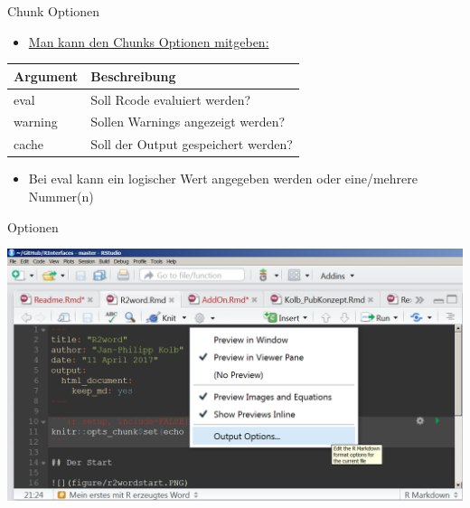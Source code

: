 \documentclass[ignorenonframetext,]{beamer}
\providecommand{\tightlist}{%
\setlength{\itemsep}{0pt}\setlength{\parskip}{0pt}}
\begin{document}
\begin{frame}{Chunk Optionen}

\begin{itemize}
\tightlist
\item
  \href{https://yihui.name/knitr/options/}{Man kann den Chunks Optionen
  mitgeben:}
\end{itemize}

\begin{longtable}[]{@{}ll@{}}
\toprule
Argument & Beschreibung\tabularnewline
\midrule
\endhead
eval & Soll Rcode evaluiert werden?\tabularnewline
warning & Sollen Warnings angezeigt werden?\tabularnewline
cache & Soll der Output gespeichert werden?\tabularnewline
\bottomrule
\end{longtable}

\begin{itemize}
\tightlist
\item
  Bei eval kann ein logischer Wert angegeben werden oder eine/mehrere
  Nummer(n)
\end{itemize}

\end{frame}

\begin{frame}{Optionen}

\includegraphics{./tex2pdf.956/c21462827b02e887fc8f91cd0cdb51e5b48be417.png}

\end{frame}
\end{document}
